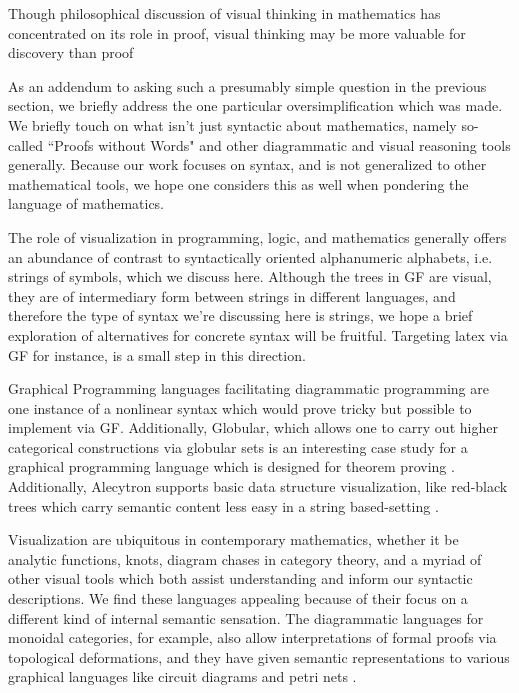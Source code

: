 \begin{displayquote}
Though philosophical discussion of visual thinking in mathematics has
concentrated on its role in proof, visual thinking may be more valuable for
discovery than proof \cite{sep-epistemology-visual-thinking}
\end{displayquote}

As an addendum to asking such a presumably simple question in the previous
section, we briefly address the one particular oversimplification which was
made. We briefly touch on what isn't just syntactic about mathematics, namely
so-called ``Proofs without Words" \cite{proofWW} and other diagrammatic and visual
reasoning tools generally. Because our work focuses on syntax, and is not
generalized to other mathematical tools, we hope one considers this as well when
pondering the language of mathematics.

The role of visualization in programming, logic, and mathematics generally offers
an abundance of contrast to syntactically oriented alphanumeric alphabets, i.e.
strings of symbols, which we discuss here. Although the trees in GF are visual,
they are of intermediary form between strings in different languages, and
therefore the type of syntax we're discussing here is strings, we hope a brief
exploration of alternatives for concrete syntax will be fruitful. Targeting
latex via GF for instance, is a small step in this direction.

Graphical Programming languages facilitating diagrammatic programming are one
instance of a nonlinear syntax which would prove tricky but possible to
implement via GF.  Additionally, Globular, which allows one to
carry out higher categorical constructions via globular sets is an interesting
case study for a graphical programming language which is designed for 
theorem proving \cite{Bar2016GlobularAO}.
Additionally, Alecytron  supports basic data structure
visualization, like red-black trees which carry semantic content less easy in a
string based-setting \cite{coqAlec}.

Visualization are ubiquitous in contemporary mathematics, whether it be
analytic functions, knots, diagram chases in category theory, and a myriad of
other visual tools which both assist understanding and inform our syntactic
descriptions. We find these languages appealing because of their focus on a different kind of
internal semantic sensation. The diagrammatic languages for monoidal categories, for example, also allow
interpretations of formal proofs via topological deformations, and they have
given semantic representations to various graphical languages like circuit
diagrams and petri nets \cite{fong2016algebra}.

